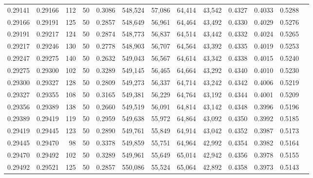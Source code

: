 \begin{tabular}{rrrrrrrrrrrrr}
0.29141 & 0.29166 &   112 &  50 &                                     0.3086 & 548,524 &  57,086 &  64,414 &  43,542 & 0.4327 & 0.4033 & 0.5288 \\
0.29166 & 0.29191 &   125 &  50 &                                     0.2857 & 548,649 &  56,961 &  64,464 &  43,492 & 0.4330 & 0.4029 & 0.5276 \\
0.29191 & 0.29217 &   124 &  50 &                                     0.2874 & 548,773 &  56,837 &  64,514 &  43,442 & 0.4332 & 0.4024 & 0.5265 \\
0.29217 & 0.29246 &   130 &  50 &                                     0.2778 & 548,903 &  56,707 &  64,564 &  43,392 & 0.4335 & 0.4019 & 0.5253 \\
0.29247 & 0.29275 &   140 &  50 &                                     0.2632 & 549,043 &  56,567 &  64,614 &  43,342 & 0.4338 & 0.4015 & 0.5240 \\
0.29275 & 0.29300 &   102 &  50 &                                     0.3289 & 549,145 &  56,465 &  64,664 &  43,292 & 0.4340 & 0.4010 & 0.5230 \\
0.29300 & 0.29327 &   128 &  50 &                                     0.2809 & 549,273 &  56,337 &  64,714 &  43,242 & 0.4342 & 0.4006 & 0.5219 \\
0.29327 & 0.29355 &   108 &  50 &                                     0.3165 & 549,381 &  56,229 &  64,764 &  43,192 & 0.4344 & 0.4001 & 0.5209 \\
0.29356 & 0.29389 &   138 &  50 &                                     0.2660 & 549,519 &  56,091 &  64,814 &  43,142 & 0.4348 & 0.3996 & 0.5196 \\
0.29389 & 0.29419 &   119 &  50 &                                     0.2959 & 549,638 &  55,972 &  64,864 &  43,092 & 0.4350 & 0.3992 & 0.5185 \\
0.29419 & 0.29445 &   123 &  50 &                                     0.2890 & 549,761 &  55,849 &  64,914 &  43,042 & 0.4352 & 0.3987 & 0.5173 \\
0.29445 & 0.29470 &    98 &  50 &                                     0.3378 & 549,859 &  55,751 &  64,964 &  42,992 & 0.4354 & 0.3982 & 0.5164 \\
0.29470 & 0.29492 &   102 &  50 &                                     0.3289 & 549,961 &  55,649 &  65,014 &  42,942 & 0.4356 & 0.3978 & 0.5155 \\
0.29492 & 0.29521 &   125 &  50 &                                     0.2857 & 550,086 &  55,524 &  65,064 &  42,892 & 0.4358 & 0.3973 & 0.5143 \\

\end{tabular}
